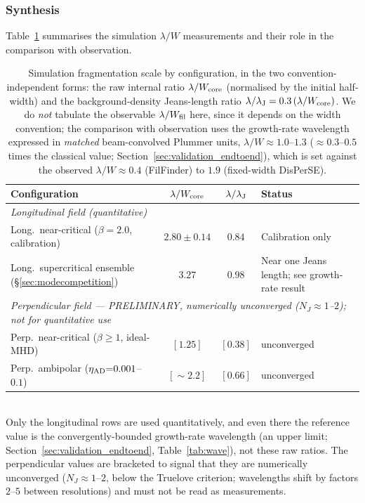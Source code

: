 \documentclass[usenatbib,twoside,twocolumn]{mnras}
\begin{document}
\subsubsection{Synthesis}

Table~\ref{tab:cross_campaign} summarises the simulation $\lambda/W$ measurements and their role in the comparison with observation.

\begin{table}
\caption{Simulation fragmentation scale by configuration, in the two convention-independent forms: the raw internal ratio $\lambda/W_{\rm core}$ (normalised by the initial half-width) and the background-density Jeans-length ratio $\lambda/\lambda_{\rm J}=0.3\,(\lambda/W_{\rm core})$. We do \emph{not} tabulate the observable $\lambda/W_{\rm fil}$ here, since it depends on the width convention; the comparison with observation uses the growth-rate wavelength expressed in \emph{matched} beam-convolved Plummer units, $\lambda/W\approx1.0$--$1.3$ ($\approx0.3$--$0.5$ times the classical value; Section~\ref{sec:validation_endtoend}), which is set against the observed $\lambda/W\approx0.4$ (FilFinder) to $1.9$ (fixed-width DisPerSE).}
\label{tab:cross_campaign}
\footnotesize
\setlength{\tabcolsep}{4pt}
\begin{tabular}{lccl}
\toprule
Configuration & $\lambda/W_{\rm core}$ & $\lambda/\lambda_{\rm J}$ & Status \\
\midrule
\multicolumn{4}{l}{\emph{Longitudinal field (quantitative)}} \\
Long.\ near-critical ($\beta{=}2.0$, calibration) & $2.80{\pm}0.14$ & $0.84$ & Calibration only \\
Long.\ supercritical ensemble (\S\ref{sec:modecompetition}) & $3.27$ & $0.98$ & Near one Jeans length; see growth-rate result \\
\midrule
\multicolumn{4}{l}{\emph{Perpendicular field --- PRELIMINARY, numerically unconverged ($N_J{\approx}1$--$2$); not for quantitative use}} \\
Perp.\ near-critical ($\beta{\geq}1$, ideal-MHD) & $[1.25]$ & $[0.38]$ & unconverged \\
Perp.\ ambipolar ($\eta_{\rm AD}{=}0.001$--$0.1$) & $[{\sim}2.2]$ & $[0.66]$ & unconverged \\
\bottomrule
\end{tabular}
\\[2pt]
Only the longitudinal rows are used quantitatively, and even there the reference value is the convergently-bounded growth-rate wavelength (an upper limit; Section~\ref{sec:validation_endtoend}, Table~\ref{tab:wave}), not these raw ratios. The perpendicular values are bracketed to signal that they are numerically unconverged ($N_J\approx1$--$2$, below the Truelove criterion; wavelengths shift by factors $2$--$5$ between resolutions) and must not be read as measurements.
\end{table}
\end{document}
